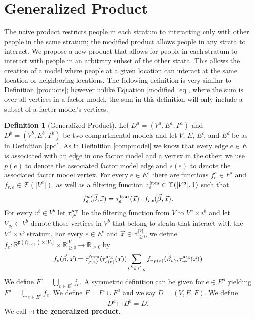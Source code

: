 \documentclass{article}
\theoremstyle{definition}
\newtheorem{definition}{Definition}
\newcommand{\R}{\mathbb{R}}%
\newcommand{\Rnn}{\mathbb{R}_{\ge 0}}%
\newcommand{\abs}[1]{\lvert #1 \rvert}%
\newcommand{\pardim}[1]{\mathfrak{p}(#1)}%
\newcommand{\betavec}{\vec{\beta}}
\newcommand{\xvec}{\vec{x}}
\newcommand{\fr}{\ensuremath{\mathcal F}}
\newcommand{\tauf}{\tau^{\mbox{\tiny from}}}
\newcommand{\taua}{\tau^{\mbox{\tiny arg}}}
\begin{document}
\section{Generalized Product}\label{general}
The naive product restricts people in each stratum to interacting only with other people in the same stratum; the modified product allows people in any strata to interact. We propose a new product that allows for people in each stratum to interact with people in an arbitrary subset of the other strata. This allows the creation of a model where people at a given location can interact at the same location or neighboring locations. The following definition is very similar to Definition \ref{products}; however unlike Equation \ref{modified_eq}, where the sum is over all vertices in a factor model, the sum in this definition will only include a subset of a factor model's vertices.

\begin{definition}[Generalized Product]
    Let $D^a = (V^a, E^a, F^a)$ and $D^b = (V^b, E^b, F^b)$ be two compartmental models and let $V$, $E$, $E^c$, and $E^d$ be as in Definition \ref{cpd}. As in Definition \ref{compmodel} we know that every edge $e\in E$ is associated with an edge in one factor model and a vertex in the other; we use $p(e)$ to denote the associated factor model edge and $s(e)$ to denote the associated factor model vertex. For every $e\in E^a$ there are functions $f^a_{e}\in F^a$ and $f_{r,e}\in \fr(\abs{V^a})$, as well as a filtering function $\tauf_{e}\in\Upsilon(\abs{V^a}, 1)$ such that
    \begin{equation}
        f^a_{e}(\betavec, \xvec) = \tauf_e(\xvec)\cdot f_{r,e}(\betavec, \xvec).
    \end{equation}
        For every $v^b\in V^b$ let $\taua_{v^b}$ be the filtering function from $V$ to $V^a\times v^b$ and let $V_{v_b}\subset V^b$ denote those vertices in $V^b$ that belong to strata that interact with the $V^a\times v^b$ stratum. For every $e\in E^c$ and $\vec{x}\in\Rnn^{\abs{V}}$ we define $f_e:\R^{\pardim{f^a_{p(e)}}\times \abs{V_{v_b}}}\times\Rnn^{\abs{V}}\rightarrow\Rnn$ by
     \begin{equation}
        f_e(\vec{\beta}, \vec{x}) = \tauf_{p(e)}(\taua_{s(e)}(\xvec))\sum\limits_{v^b\in V_{v_b}} f_{r,p(e)}(\betavec_{v^b},\taua_{v^b}(\xvec))
     \end{equation}
     We define $F^{c} = \bigcup\limits_{e\in E^c}f_e$. A symmetric definition can be given for $e\in E^d$ yielding $F^{d} = \bigcup\limits_{e\in E^d}f_e$. We define $F = F^{c}\cup F^{d}$ and we say $D=(V, E, F)$. We define
    \begin{equation}
        D^a\boxdot D^b = D.
    \end{equation} We call $\boxdot$ \textbf{the generalized product}.
\end{definition}
\end{document}
